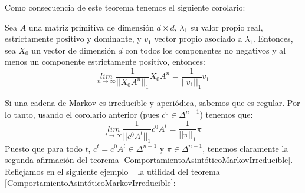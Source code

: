 Como consecuencia de este teorema tenemos el siguiente corolario:
\begin{corollary}
    Sea $A$ una matriz primitiva de dimensión $d\times d$, $\lambda_1$ su valor propio real, estrictamente positivo y dominante, y $v_1$ vector propio asociado a $\lambda_1$. Entonces, sea $X_0$ un vector de dimensión $d$ con todos los componentes no negativos y al menos un componente estrictamente positivo, entonces:
    \[\underset{n\rightarrow\infty}{lim}\frac{1}{||X_0A^n||_1}X_0A^n=\frac{1}{||v_1||_1}v_1\]
\end{corollary}
Si una cadena de Markov es irreducible y aperiódica, sabemos que es regular. Por lo tanto, usando el corolario anterior (pues $c^0\in\Delta^{n-1}$) tenemos que:
    \[\underset{t\rightarrow\infty}{lim}\frac{1}{||c^0A^t||_1}c^0A^t=\frac{1}{||\pi||_1}\pi\]
Puesto que para todo $t$, $c^t=c^0A^t\in\Delta^{n-1}$ y $\pi\in\Delta^{n-1}$, tenemos claramente la segunda afirmación del teorema \ref{ComportamientoAsintóticoMarkovIrreducible}. Reflejamos en el siguiente ejemplo ~\cite{Finanzas} la utilidad del teorema \ref{ComportamientoAsintóticoMarkovIrreducible}: 

